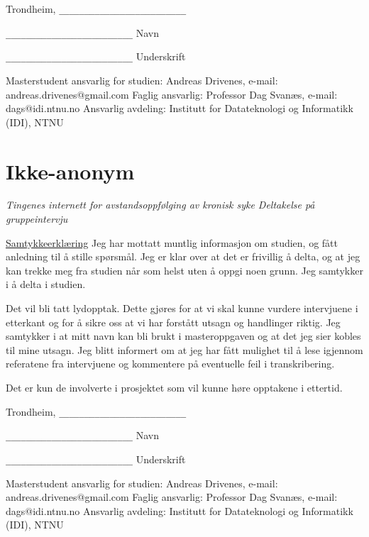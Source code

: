 Trondheim, \verb|_________________________|

\verb|_________________________|\newline
Navn

\verb|_________________________|\newline
Underskrift \newline

Masterstudent ansvarlig for studien: \newline
	Andreas Drivenes, e-mail: andreas.drivenes@gmail.com \newline
Faglig ansvarlig: \newline
	Professor Dag Svanæs, e-mail: dags@idi.ntnu.no \newline
Ansvarlig avdeling: \newline
	Institutt for Datateknologi og Informatikk (IDI), NTNU

\section{Ikke-anonym}
\begin{center} \textit{Tingenes internett for avstandsoppfølging av kronisk syke \newline
Deltakelse på gruppeintervju}
\end{center}
\underline{Samtykkeerklæring} \newline
Jeg har mottatt muntlig informasjon om studien, og fått anledning til å stille spørsmål. Jeg er klar over at det er frivillig
å delta, og at jeg kan trekke meg fra studien når som helst uten å oppgi noen grunn. Jeg samtykker i å delta i studien.

Det vil bli tatt lydopptak.  Dette gjøres for at vi skal kunne vurdere intervjuene i etterkant og for å sikre oss at vi har
forstått utsagn og handlinger riktig. Jeg samtykker i at mitt navn kan bli brukt i masteroppgaven og at det jeg sier kobles
til mine utsagn. Jeg blitt informert om at jeg har fått mulighet til å lese igjennom referatene fra intervjuene og
kommentere på eventuelle feil i transkribering. 

Det er kun de involverte i prosjektet som vil kunne høre opptakene i ettertid.

Trondheim, \verb|_________________________|

\verb|_________________________|\newline
Navn

\verb|_________________________|\newline
Underskrift \newline

Masterstudent ansvarlig for studien: \newline
	Andreas Drivenes, e-mail: andreas.drivenes@gmail.com \newline
Faglig ansvarlig: \newline
	Professor Dag Svanæs, e-mail: dags@idi.ntnu.no \newline
Ansvarlig avdeling: \newline
	Institutt for Datateknologi og Informatikk (IDI), NTNU
